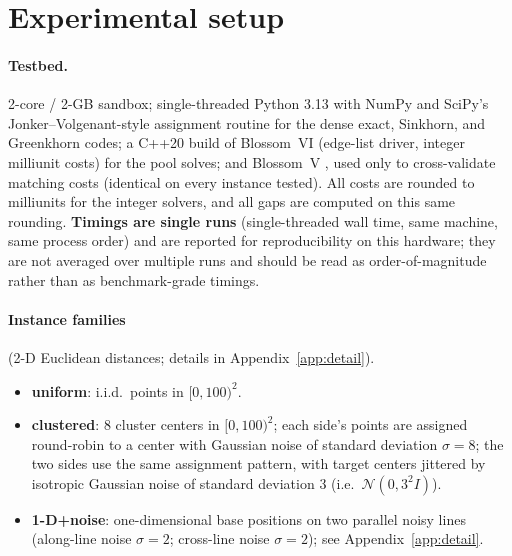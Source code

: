 \documentclass[11pt]{article}
\theoremstyle{remark}
\begin{document}
\section{Experimental setup}
\label{sec:setup}

\paragraph{Testbed.} 2-core / 2-GB sandbox; single-threaded Python 3.13
with NumPy and SciPy's Jonker--Volgenant-style assignment routine for the
dense exact, Sinkhorn, and Greenkhorn codes; a C++20 build of Blossom~VI
\cite{blossomvi} (edge-list driver, integer milliunit costs) for the pool
solves; and Blossom~V \cite{blossomv}, used only to cross-validate
matching costs (identical on every instance tested). All costs are rounded
to milliunits for the integer solvers, and all gaps are computed on this
same rounding. \textbf{Timings are single runs} (single-threaded wall time,
same machine, same process order) and are reported for reproducibility on
this hardware; they are not averaged over multiple runs and should be
read as order-of-magnitude rather than as benchmark-grade timings.

\paragraph{Instance families} (2-D Euclidean distances; details in
Appendix~\ref{app:detail}).
\begin{itemize}[leftmargin=2em,itemsep=1pt]
\item \textbf{uniform}: i.i.d.\ points in $[0,100)^2$.
\item \textbf{clustered}: 8 cluster centers in $[0,100)^2$; each side's
  points are assigned round-robin to a center with Gaussian noise of
  standard deviation $\sigma=8$; the two sides use the same assignment
  pattern, with target centers jittered by isotropic Gaussian noise of
  standard deviation $3$ (i.e.\ $\mathcal{N}(0,3^2 I)$).
\item \textbf{1-D+noise}: one-dimensional base positions on two parallel
  noisy lines (along-line noise $\sigma=2$; cross-line noise $\sigma=2$);
  see Appendix~\ref{app:detail}.
\end{itemize}
\end{document}
